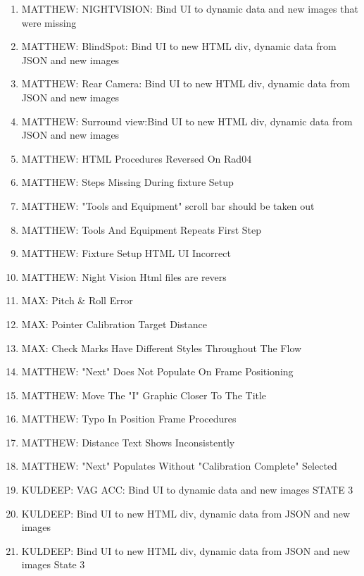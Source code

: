 \begin{enumerate}[leftmargin=!,labelindent=5pt,itemindent=-35pt]
\item {} MATTHEW: NIGHTVISION: Bind UI to dynamic data and new images that were missing
\item {} MATTHEW: BlindSpot: Bind UI to new HTML div, dynamic data from JSON and new images
\item {} MATTHEW: Rear Camera: Bind UI to new HTML div, dynamic data from JSON and new images
\item {} MATTHEW: Surround view:Bind UI to new HTML div, dynamic data from JSON and new images
\item {} MATTHEW: HTML Procedures Reversed On Rad04
\item {} MATTHEW: Steps Missing During fixture Setup
\item {} MATTHEW: "Tools and Equipment" scroll bar should be taken out
\item {} MATTHEW: Tools And Equipment Repeats First Step
\item {} MATTHEW: Fixture Setup HTML UI Incorrect
\item {} MATTHEW: Night Vision Html files are revers
\item {} MAX: Pitch \& Roll Error
\item {} MAX: Pointer Calibration Target Distance
\item {} MAX: Check Marks Have Different Styles Throughout The Flow
\item {} MATTHEW: "Next" Does Not Populate On Frame Positioning
\item {} MATTHEW: Move The "I" Graphic Closer To The Title
\item {} MATTHEW: Typo In Position Frame Procedures
\item {} MATTHEW: Distance Text Shows Inconsistently
\item {} MATTHEW: "Next" Populates Without "Calibration Complete" Selected
\item {} KULDEEP: VAG ACC: Bind UI to dynamic data and new images STATE 3
\item {} KULDEEP: Bind UI to new HTML div, dynamic data from JSON and new images
\item {} KULDEEP: Bind UI to new HTML div, dynamic data from JSON and new images State 3
\end{enumerate}\vspace{.5cm}
